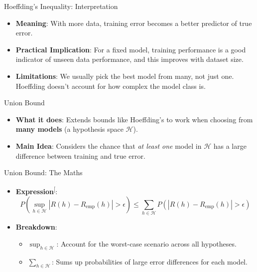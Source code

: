 \documentclass[
  ignorenonframetext,
]{beamer}
\providecommand{\tightlist}{%
  \setlength{\itemsep}{0pt}\setlength{\parskip}{0pt}}\usepackage{longtable,booktabs,array}
\begin{document}
\begin{frame}{Hoeffding's Inequality: Interpretation}
\label{hoeffdings-inequality-interpretation}
\begin{itemize}
\tightlist
\item
  \textbf{Meaning}: With more data, training error becomes a better
  predictor of true error.
\item
  \textbf{Practical Implication}: For a fixed model, training
  performance is a good indicator of unseen data performance, and this
  improves with dataset size.
\item
  \textbf{Limitations}: We usually pick the best model from many, not
  just one. Hoeffding doesn't account for how complex the model class
  is.
\end{itemize}
\end{frame}

\begin{frame}{Union Bound}
\label{union-bound}
\begin{itemize}
\tightlist
\item
  \textbf{What it does}: Extends bounds like Hoeffding's to work when
  choosing from \textbf{many models} (a hypothesis space
  \(\mathcal{H}\)).
\item
  \textbf{Main Idea}: Considers the chance that \emph{at least one}
  model in \(\mathcal{H}\) has a large difference between training and
  true error.
\end{itemize}
\end{frame}

\begin{frame}{Union Bound: The Maths}
\label{union-bound-the-maths}
\begin{itemize}
\tightlist
\item
  \textbf{Expression}\textsuperscript{{[}\citeproc{ref-samir16}{4}{]}}:
  \[
  P\left(\sup_{h \in \mathcal{H}} |R(h) - R_{\text{emp}}(h)| > \epsilon \right) \leq \sum_{h \in \mathcal{H}} P\left(|R(h) - R_{\text{emp}}(h)| > \epsilon \right)
  \]
\item
  \textbf{Breakdown}:

  \begin{itemize}
  \tightlist
  \item
    \(\sup_{h \in \mathcal{H}}\): Account for the worst-case scenario
    across all hypotheses.
  \item
    \(\sum_{h \in \mathcal{H}}\): Sums up probabilities of large error
    differences for each model.
  \end{itemize}
\end{itemize}
\end{frame}
\end{document}
